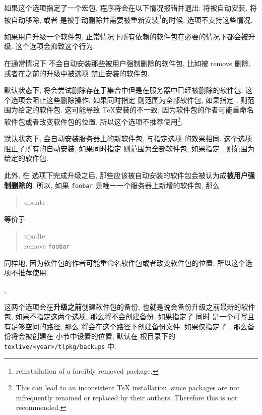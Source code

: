 \begin{description}
    如果这个选项指定了一个宏包, 程序将会在以下情况报错并退出:  将被自动安装,  将被自动移除, 或者  是被手动删除并需要被重新安装\footnote{reinstallation of a forcibly removed package.}的时候.  选项不支持这些情况. 
    \item {}\par
    如果用户升级一个软件包, 正常情况下所有依赖的软件包在必要的情况下都会被升级. 这个选项会抑致这个行为. 
    \item \hypertarget{op:-reinstall-forcibly-removed}{}\par
    在通常情况下 \tlmgr 不会自动安装那些被用户强制删除的软件包, 比如被 \ac{remove}  删除, 或者在之前的升级中被选项  禁止安装的软件包. 
    \item {} \par
    默认状态下, \tlmgr 将会尝试删除存在于集合中但是在服务器中已经被删除的软件包. 这个选项会阻止这些删除操作, 如果同时指定  则范围为全部软件包, 如果指定 , 则范围为给定的软件包. 这可能导致 \TeX 安装的不一致, 因为软件包的作者可能重命名软件包或者改变软件包的位置, 所以这个选项不推荐使用\footnote{This can lead to an inconsistent TeX installation, since packages are not infrequently renamed or replaced by their authors. Therefore this is not recommended.}.
    \item {} \par
    默认状态下, \tlmgr 会自动安装服务器上的新软件包, 与指定选项  的效果相同. 这个选项阻止了所有的自动安装, 如果同时指定  则范围为全部软件包, 如果指定 , 则范围为给定的软件包.

    此外, 在  选项下完成升级之后, 那些应该被自动安装的软件包会被认为成\textbf{被用户强制删除的}. 所以, 如果 \texttt{foobar} 是唯一一个服务器上新增的软件包, 那么
    \begin{quote}
        \tlmgr{} \ac{update}  
    \end{quote}
    等价于
    \begin{quote}
        \tlmgr{} \ac{upadte} \\
        \tlmgr{} \ac{remove}  \texttt{foobar}
    \end{quote}
    同样地, 因为软件包的作者可能重命名软件包或者改变软件包的位置, 所以这个选项不推荐使用. 
    \item \hypertarget{op:backup}{,  }\par
    这两个选项会在\textbf{升级之前}创建软件包的备份, 也就是说会备份升级之前最新的软件包, 如果不指定这两个选项, 那么将不会创建备份. 如果指定了  同时  是一个可写且有足够空间的路径, 那么 \tlmgr 将会在这个路径下创建备份文件. 如果仅指定了 , 那么备份将会被创建在  小节中设置的位置, 默认在 \tl 根目录下的 \texttt{texlive/<year>/tlpkg/backups} 中.  


\end{description}
